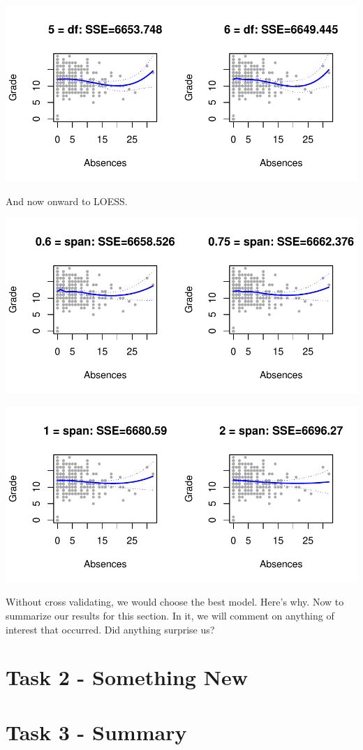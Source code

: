 \documentclass{article}
\begin{document}
\includegraphics{Report_4-010}

And now onward to LOESS.

\includegraphics{Report_4-011}

\includegraphics{Report_4-012}

Without cross validating, we would choose the best model. Here's why.
Now to summarize our results for this section. In it, we will comment on anything of interest that occurred. Did anything surprise us? 

\section{Task 2 - Something New}



\section{Task 3 - Summary}
\end{document}
